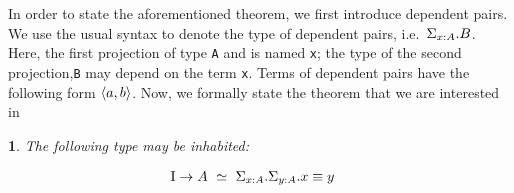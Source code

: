 \documentclass[12pt,twoside,maitrise]{dms}
\newtheorem{theo}[cor]{\theoremname}
\theoremstyle{definition}
\numberwithin{equation}{section}
\numberwithin{table}{chapter}
\numberwithin{figure}{chapter}
\newcommand\id[1] {\texttt{#1}}
\begin{document}
In order to state the aforementioned theorem, we first introduce dependent
pairs. We use the usual syntax to denote the type of dependent pairs,
i.e.\ $\Sigma_{\oftype{x}{A}}. B$. Here, the first projection of type \id{A} and
is named \id{x}; the type of the second projection,\id{B} may depend on the term
\id{x}. Terms of dependent pairs have the following form $\braket{a, b}$. Now,
we formally state the theorem that we are interested in

\begin{theo}
The following type may be inhabited:

\begin{align*}
  & \bI \rightarrow A \ \simeq \ \Sigma_{\oftype{x}{A}} . \Sigma_{\oftype{y}{A}} . \eqtype{x}{y}
\end{align*}

\end{theo}
\end{document}
